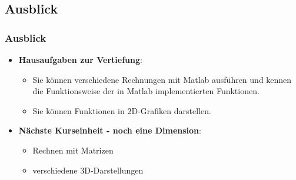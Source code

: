       \subsection{Ausblick}
      \begin{frame}
        \frametitle{Ausblick}
        \begin{itemize}
            \item \textbf{Hausaufgaben zur Vertiefung}:
            \begin{itemize}
                \item Sie können verschiedene Rechnungen mit Matlab ausführen und kennen die Funktionsweise der in Matlab implementierten Funktionen.
                \item Sie können Funktionen in 2D-Grafiken darstellen.
            \end{itemize}
            \item \textbf{Nächste Kurseinheit - noch eine Dimension}:
            \begin{itemize}
                \item Rechnen mit Matrizen
                \item verschiedene 3D-Darstellungen
            \end{itemize}
        \end{itemize}
      \end{frame}


